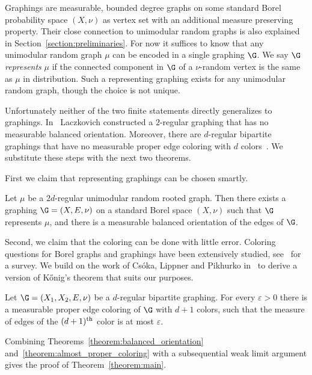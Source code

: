 Graphings are measurable, bounded degree graphs on some standard Borel probability space $(X,\nu)$ as vertex set with an additional measure preserving property. Their close connection to unimodular random graphs is also explained in Section~\ref{section:preliminaries}. For now it suffices to know that any unimodular random graph $\mu$ can be encoded in a single graphing $\G$. We say $\G$ \emph{represents} $\mu$ if the connected component in $\G$ of a $\nu$-random vertex is the same as $\mu$ in distribution. Such a representing graphing exists for any unimodular random graph, though the choice is not unique.

Unfortunately neither of the two finite statements directly generalizes to graphings. In~\cite{laczkovich1988closed} Laczkovich constructed a $2$-regular graphing that has no measurable balanced orientation. Moreover, there are $d$-regular bipartite graphings that have no measurable proper edge coloring with $d$ colors~\cite[Section~6]{conley2013measurable}. We substitute these steps with the next two theorems.

First we claim that representing graphings can be chosen smartly.

\begin{theo}\label{theorem:balanced_orientation}
Let $\mu$ be a $2d$-regular unimodular random rooted graph. Then there exists a graphing $\G=(X,E,\nu)$ on a standard Borel space $(X, \nu)$ such that $\G$ represents $\mu$, and there is a measurable balanced orientation of the edges of $\G$.
\end{theo}

Second, we claim that the coloring can be done with little error. Coloring questions for Borel graphs and graphings have been extensively studied, see~\cite{kechris2015descriptive} for a survey. We build on the work of Cs{\'o}ka, Lippner and Pikhurko in~\cite{csoka2016kHonig} to derive a version of K{\H o}nig's theorem that suits our purposes.

\begin{theo}\label{theorem:almost_proper_coloring}
Let $\G=(X_1,X_2,E, \nu)$ be a $d$-regular bipartite graphing. For every $\varepsilon > 0$ there is a measurable proper edge coloring of $\G$ with $d+1$ colors, such that the measure of edges of the $(d+1)^{\rm th}$ color is at most $\varepsilon$.
\end{theo}
Combining Theorems~\ref{theorem:balanced_orientation} and~\ref{theorem:almost_proper_coloring} with a subsequential weak limit argument gives the proof of Theorem~\ref{theorem:main}.
%


